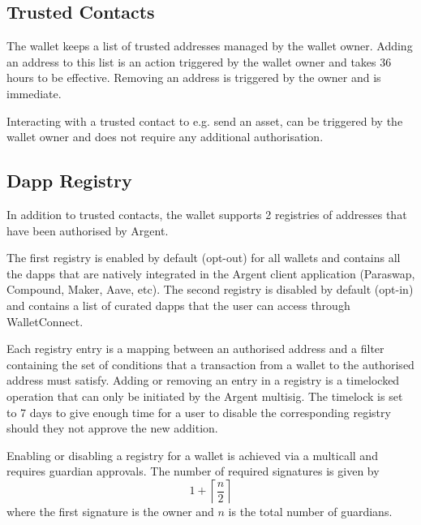 \documentclass[12pt]{article}
\begin{document}
\subsection{Trusted Contacts}
\label{sec:trusted-contacts}

The wallet keeps a list of trusted addresses managed by the wallet owner.
Adding an address to this list is an action triggered by the wallet owner and takes 36 hours to be effective. Removing an address is triggered by the owner and is immediate.

Interacting with a trusted contact to e.g. send an asset, can be triggered by the wallet owner and does not require any additional authorisation. 

\subsection{Dapp Registry}
\label{sec:authorised-dapps}

In addition to trusted contacts, the wallet supports 2 registries of addresses that have been authorised by Argent.

The first registry is enabled by default (opt-out) for all wallets and contains all the dapps that are natively integrated in the Argent client application (Paraswap, Compound, Maker, Aave, etc). The second registry is disabled by default (opt-in) and contains a list of curated dapps that the user can access through WalletConnect.

Each registry entry is a mapping between an authorised address and a filter containing the set of conditions that a transaction from a wallet to the authorised address must satisfy.
Adding or removing an entry in a registry is a timelocked operation that can only be initiated by the Argent multisig.
The timelock is set to 7 days to give enough time for a user to disable the corresponding registry should they not approve the new addition.

Enabling or disabling a registry for a wallet is achieved via a multicall and requires guardian approvals. The number of required signatures is given by
\begin{equation*}
    1+\left\lceil {\frac{n}{2}} \right\rceil
\end{equation*}
where the first signature is the owner and $n$ is the total number of guardians.
\end{document}
